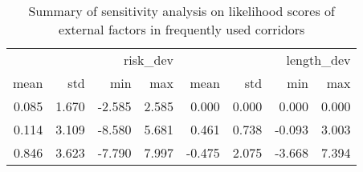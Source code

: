 \begin{table}
\caption{Summary of sensitivity analysis on likelihood scores of external factors in frequently used corridors}
\label{tab:sa2_likelihood_summary}
\begin{tabular}{rrrrrrrr}
\toprule
\multicolumn{4}{r}{risk_dev} & \multicolumn{4}{r}{length_dev} \\
mean & std & min & max & mean & std & min & max \\
\midrule
0.085 & 1.670 & -2.585 & 2.585 & 0.000 & 0.000 & 0.000 & 0.000 \\
0.114 & 3.109 & -8.580 & 5.681 & 0.461 & 0.738 & -0.093 & 3.003 \\
0.846 & 3.623 & -7.790 & 7.997 & -0.475 & 2.075 & -3.668 & 7.394 \\
\bottomrule
\end{tabular}
\end{table}
